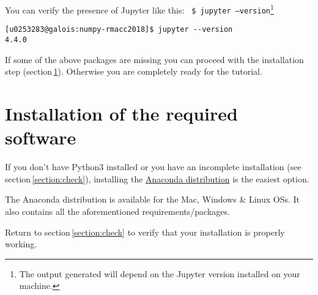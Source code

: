 \documentclass[11pt]{article}
\begin{document}
You can verify the presence of Jupyter like this:\newline\newline
\texttt{
\$ jupyter --version}\footnote{The output generated will depend on the Jupyter version installed on your machine.}
\begin{verbatim}
[u0253283@galois:numpy-rmacc2018]$ jupyter --version
4.4.0
\end{verbatim}

If some of the above packages are missing you can proceed with 
the installation step (section\,\ref{section:install}). Otherwise 
you are completely ready for the tutorial.
 
\section{Installation of the required software}\label{section:install}
If you don't have Python$3$ installed or you have an incomplete installation 
(see section\,\ref{section:check}),
installing the \href{https://www.anaconda.com/download/}{Anaconda distribution} is 
the easiest option.

The Anaconda distribution is available for the Mac, Windows \& Linux OSs. 
It also contains all the aforementioned requirements/packages.

Return to section\,\ref{section:check} to verify that your installation is properly working.

%
%
\end{document}

